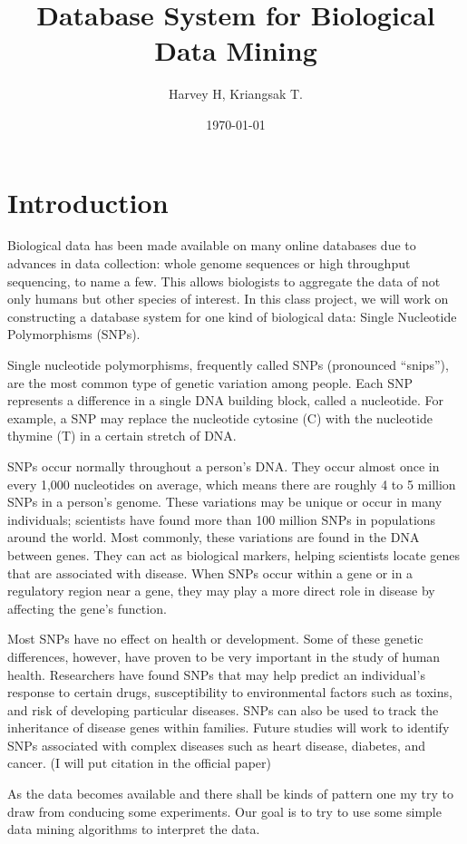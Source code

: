 \documentclass[12pt]{extarticle}
\title{Database System for Biological Data Mining}
\author{Harvey H, Kriangsak T.}
\date{\today}
\begin{document}
\maketitle
\section*{Introduction}
Biological data has been made available on many online databases due to advances in data collection: whole genome sequences or high throughput sequencing, to name a few. This allows biologists to aggregate the data of not only humans but other species of interest. In this class project, we will work on constructing a database system for one kind of biological data: Single Nucleotide Polymorphisms (SNPs). 

Single nucleotide polymorphisms, frequently called SNPs (pronounced “snips”), are the most common type of genetic variation among people. Each SNP represents a difference in a single DNA building block, called a nucleotide. For example, a SNP may replace the nucleotide cytosine (C) with the nucleotide thymine (T) in a certain stretch of DNA.

SNPs occur normally throughout a person’s DNA. They occur almost once in every 1,000 nucleotides on average, which means there are roughly 4 to 5 million SNPs in a person's genome. These variations may be unique or occur in many individuals; scientists have found more than 100 million SNPs in populations around the world. Most commonly, these variations are found in the DNA between genes. They can act as biological markers, helping scientists locate genes that are associated with disease. When SNPs occur within a gene or in a regulatory region near a gene, they may play a more direct role in disease by affecting the gene’s function.

Most SNPs have no effect on health or development. Some of these genetic differences, however, have proven to be very important in the study of human health. Researchers have found SNPs that may help predict an individual’s response to certain drugs, susceptibility to environmental factors such as toxins, and risk of developing particular diseases. SNPs can also be used to track the inheritance of disease genes within families. Future studies will work to identify SNPs associated with complex diseases such as heart disease, diabetes, and cancer.
(I will put citation in the official paper)

As the data becomes available and there shall be kinds of pattern one my try to draw from conducing some experiments. Our goal is to try to use some simple data mining  algorithms to interpret the data.
\end{document}
